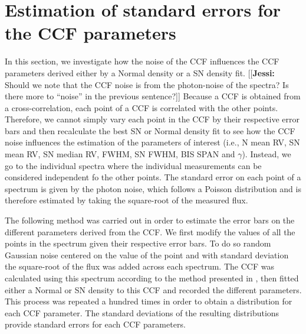 \documentclass{aa}
\newcommand{\jessi}[1]{{\color{Purple}[[\textbf{Jessi: }#1]]}}
\begin{document}
\section{Estimation of standard errors for the CCF parameters} \label{sec:5}

In this section, we investigate how the noise of the CCF influences the CCF parameters derived either by a Normal density or a SN density fit. 
\jessi{Should we note that the CCF noise is from the photon-noise of the spectra?  Is there more to ``noise'' in the previous sentence?}
Because a CCF is obtained from a cross-correlation, each point of a CCF is correlated with the other points. Therefore, we cannot simply vary each point in the CCF by their respective error bars and then recalculate the best SN or Normal density fit to see how the CCF noise influences the estimation of the parameters of interest (i.e., N mean RV, SN mean RV, SN median RV, FWHM, SN FWHM, BIS SPAN and $\gamma$). 
Instead, we go to the individual spectra where the individual measurements can be considered independent fo the other points.
The standard error on each point of a spectrum is given by the photon noise, which follows a Poisson distribution and is therefore estimated by taking the square-root of the measured flux.

The following method was carried out in order to estimate the error bars on the different parameters derived from the CCF. 
We first modify the values of all the points in the spectrum given their respective error bars. 
To do so random Gaussian noise centered on the value of the point and with standard deviation the square-root of the flux was added across each spectrum. 
The CCF was calculated using this spectrum according to the method presented in \citet{Pepe-2002a}, then fitted either a Normal or SN density to this CCF and recorded the different parameters. 
This process was repeated a hundred times in order to obtain a distribution for each CCF parameter. 
The standard deviations of the resulting distributions provide standard errors for each CCF parameters.
\end{document}
